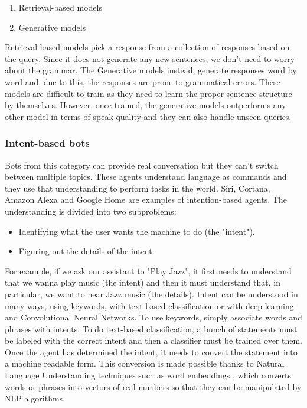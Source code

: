 \documentclass[b5paper,10pt,twoside,cucitura]{toptesi}
\begin{document}
\begin{enumerate}
    \item Retrieval-based models
    \item Generative models
\end{enumerate}

Retrieval-based models pick a response from a collection of responses based on the query. Since it does not generate any new sentences, we don't need to worry about the grammar.
The Generative models instead, generate responses word by word and, due to this, the responses are prone to grammatical errors. These models are difficult to train as they need to learn the proper sentence structure by themselves. However, once trained, the generative models outperforms any other model in terms of speak quality and they can also handle unseen queries.

\subsubsection{Intent-based bots}
Bots from this category can provide real conversation but they can't switch between multiple topics. These agents understand language as commands and they use that understanding to perform tasks in the world. Siri, Cortana, Amazon Alexa and Google Home are examples of intention-based agents.
The understanding is divided into two subproblems:
\begin{itemize}
    \item Identifying what the user wants the machine to do (the "intent").
    \item Figuring out the details of the intent.
\end{itemize}
For example, if we ask our assistant to "Play Jazz", it first needs to understand that we wanna play music (the intent) and then it must understand that, in particular, we want to hear Jazz music (the details).
Intent can be understood in many ways, using keywords, with text-based classification or with deep learning and Convolutional Neural Networks. To use keywords, simply associate words and phrases with intents. To do text-based classification, a bunch of statements must be labeled with the correct intent and then a classifier must be trained over them. 
Once the agent has determined the intent, it needs to convert the statement into a machine readable form. This conversion is made possible thanks to Natural Language Understanding techniques such as word embeddings \citep{wordembeddings}, which converts words or phrases into vectors of real numbers so that they can be manipulated by NLP algorithms.
\end{document}
